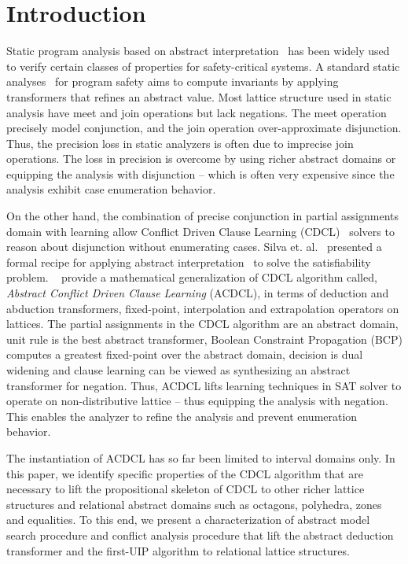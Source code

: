 \section{Introduction}
%
Static program analysis based on abstract 
interpretation~\cite{DBLP:conf/emsoft/Cousot07} has been widely used to
verify certain classes of properties for safety-critical systems.  A 
standard static analyses~\cite{se2011} for program safety aims to compute 
invariants by applying transformers that refines an abstract 
value.  Most lattice structure used in static analysis have 
meet and join operations but lack negations.  The meet operation 
precisely model conjunction, and the join operation over-approximate 
disjunction. Thus, the precision loss in static analyzers is often 
due to imprecise join operations. The loss in precision is overcome 
by using richer abstract domains or equipping the analysis with disjunction --
which is often very expensive since the analysis exhibit case enumeration 
behavior. 

On the other hand, the combination of precise conjunction in partial assignments 
domain with learning allow Conflict Driven Clause Learning (CDCL)~\cite{cdcl} 
solvers to reason about disjunction without enumerating cases.  
Silva et. al.~\cite{tacas12, sas12, dhk2013-popl} presented 
a formal recipe for applying abstract interpretation~\cite{se2011} to solve the 
satisfiability problem.  ~\cite{sas12} provide a mathematical generalization 
of CDCL algorithm called, {\em Abstract Conflict Driven Clause Learning} (ACDCL), 
in terms of deduction and abduction transformers, fixed-point, interpolation 
and extrapolation operators on lattices.  The partial assignments in the 
CDCL algorithm are an abstract domain, unit rule is the best abstract 
transformer,  Boolean Constraint Propagation (BCP) computes a greatest fixed-point 
over the abstract domain, decision is dual widening and clause learning can be 
viewed as synthesizing an abstract transformer for negation.  Thus, ACDCL 
lifts learning techniques in SAT solver to operate on non-distributive 
lattice -- thus equipping the analysis with negation. This enables the 
analyzer to refine the analysis and prevent enumeration behavior.


The instantiation of ACDCL has so far been limited to interval domains only.  
In this paper, we identify specific properties of the CDCL algorithm that 
are necessary to lift the propositional skeleton of CDCL to other richer 
lattice structures and relational abstract domains such as octagons, 
polyhedra, zones and equalities.  To this end, we present a 
characterization of abstract model search procedure and conflict 
analysis procedure that lift the abstract deduction transformer and the 
first-UIP algorithm to relational lattice structures. 

